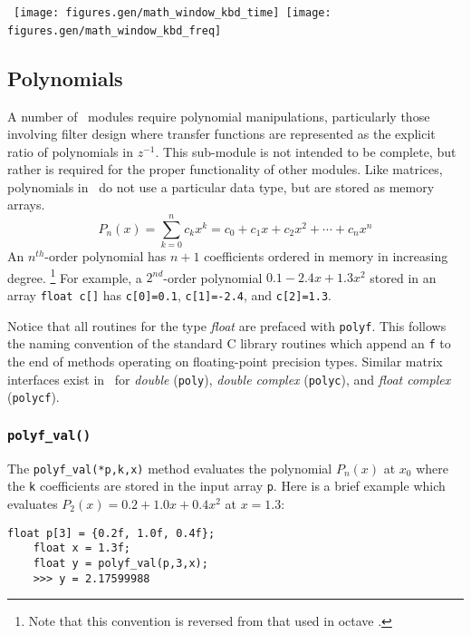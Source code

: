%
% 
\mbox{
  \centering
  \texttt{[image: figures.gen/math\_window\_kbd\_time]}
  \quad
  \texttt{[image: figures.gen/math\_window\_kbd\_freq]}
}
%


% 
%
\subsection{Polynomials}
\label{module:math:poly}
A number of \liquid\ modules require polynomial manipulations, particularly
those involving filter design where transfer functions are represented as the
explicit ratio of polynomials in $z^{-1}$.
This sub-module is not intended to be complete, but rather is required for
the proper functionality of other modules.
Like matrices, polynomials in \liquid\ do not use a particular data type, but
are stored as memory arrays.
%
\begin{equation}
\label{eqn:math:poly:representation}
    P_n(x) = \sum_{k=0}^{n}{c_k x^k}
           = c_0 + c_1 x + c_2 x^2 + \cdots + c_n x^n
\end{equation}
%
An $n^{th}$-order polynomial has $n+1$ coefficients ordered in memory in
increasing degree.%
\footnote{Note that this convention is reversed from that used in octave
\cite{octave:web}.}
For example, a $2^{nd}$-order polynomial $0.1 -2.4x + 1.3x^2$ stored in
an array {\tt float c[]} has
{\tt c[0]=0.1},
{\tt c[1]=-2.4}, and
{\tt c[2]=1.3}.

Notice that all routines for the type {\it float} are prefaced with
{\tt polyf}.
This follows the naming convention of the standard C library routines
which append an {\tt f} to the end of methods operating on
floating-point precision types.
Similar matrix interfaces exist in \liquid\ for
{\it double} ({\tt poly}),
{\it double complex} ({\tt polyc}), and
{\it float complex} ({\tt polycf}).


\subsubsection{{\tt polyf\_val()}}
\label{module:math:poly:polyf_val}
The {\tt polyf\_val(*p,k,x)} method evaluates the polynomial $P_n(x)$ at
$x_0$ where the {\tt k} coefficients are stored in the input array
{\tt p}.
Here is a brief example which evaluates $P_2(x) = 0.2 + 1.0x + 0.4x^2$
at $x=1.3$:
%
\begin{Verbatim}[fontsize=\small]
    float p[3] = {0.2f, 1.0f, 0.4f};
    float x = 1.3f;
    float y = polyf_val(p,3,x);
    >>> y = 2.17599988
\end{Verbatim}

